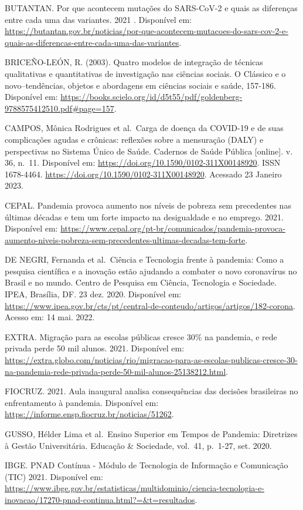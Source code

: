 \documentclass[
]{article}
\begin{document}
BUTANTAN. Por que acontecem mutações do SARS-CoV-2 e quais as diferenças
entre cada uma das variantes. 2021 . Disponível em:
\url{https://butantan.gov.br/noticias/por-que-acontecem-mutacoes-do-sars-cov-2-e-quais-as-diferencas-entre-cada-uma-das-variantes}.

BRICEÑO-LEÓN, R. (2003). Quatro modelos de integração de técnicas
qualitativas e quantitativas de investigação nas ciências sociais. O
Clássico e o novo--tendências, objetos e abordagens em ciências sociais
e saúde, 157-186. Disponível em:
\url{https://books.scielo.org/id/d5t55/pdf/goldenberg-9788575412510.pdf\#page=157}.

CAMPOS, Mônica Rodrigues et al.~Carga de doença da COVID-19 e de suas
complicações agudas e crônicas: reflexões sobre a mensuração (DALY) e
perspectivas no Sistema Único de Saúde. Cadernos de Saúde Pública
{[}online{]}. v. 36, n.~11. Disponível em:
\url{https://doi.org/10.1590/0102-311X00148920}. ISSN 1678-4464.
\url{https://doi.org/10.1590/0102-311X00148920}. Acessado 23 Janeiro
2023.

CEPAL. Pandemia provoca aumento nos níveis de pobreza sem precedentes
nas últimas décadas e tem um forte impacto na desigualdade e no emprego.
2021. Disponível em:
\url{https://www.cepal.org/pt-br/comunicados/pandemia-provoca-aumento-niveis-pobreza-sem-precedentes-ultimas-decadas-tem-forte}.

DE NEGRI, Fernanda et al.~Ciência e Tecnologia frente à pandemia: Como a
pesquisa científica e a inovação estão ajudando a combater o novo
coronavírus no Brasil e no mundo. Centro de Pesquisa em Ciência,
Tecnologia e Sociedade. IPEA, Brasília, DF. 23 dez. 2020. Disponível em:
\url{https://www.ipea.gov.br/cts/pt/central-de-conteudo/artigos/artigos/182-corona}.
Acesso em: 14 mai. 2022.

EXTRA. Migração para as escolas públicas cresce 30\% na pandemia, e rede
privada perde 50 mil alunos. 2021. Disponível em:
\url{https://extra.globo.com/noticias/rio/migracao-para-as-escolas-publicas-cresce-30-na-pandemia-rede-privada-perde-50-mil-alunos-25138212.html}.

FIOCRUZ. 2021. Aula inaugural analisa consequências das decisões
brasileiras no enfrentamento à pandemia. Disponível em:
\url{https://informe.ensp.fiocruz.br/noticias/51262}.

GUSSO, Hélder Lima et al.~Ensino Superior em Tempos de Pandemia:
Diretrizes à Gestão Universitária. Educação \& Sociedade, vol.~41,
p.~1-27, set. 2020.

IBGE. PNAD Contínua - Módulo de Tecnologia de Informação e Comunicação
(TIC) 2021. Disponível em:
\url{https://www.ibge.gov.br/estatisticas/multidominio/ciencia-tecnologia-e-inovacao/17270-pnad-continua.html?=\&t=resultados}.
\end{document}
